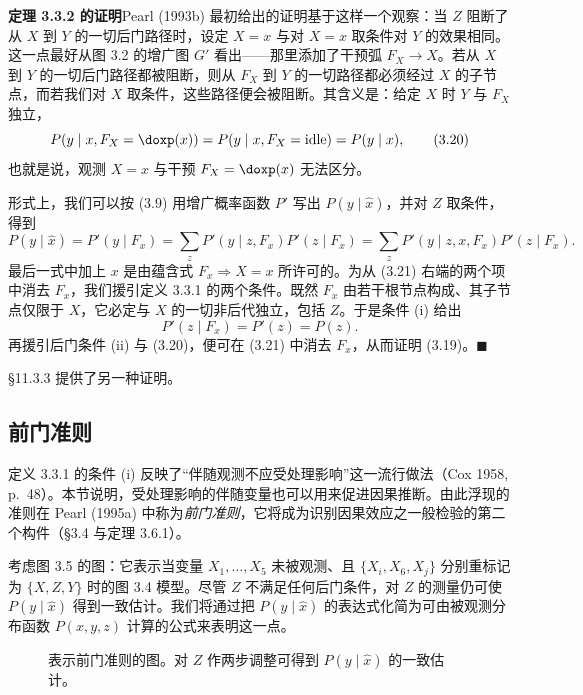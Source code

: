 \noindent\textbf{定理 3.3.2 的证明}\quad Pearl (1993b) 最初给出的证明基于这样一个观察：当 $Z$ 阻断了从 $X$ 到 $Y$ 的一切后门路径时，设定 $X=x$ 与对 $X=x$ 取条件对 $Y$ 的效果相同。这一点最好从图 3.2 的增广图 $G'$ 看出——那里添加了干预弧 $F_X\to X$。若从 $X$ 到 $Y$ 的一切后门路径都被阻断，则从 $F_X$ 到 $Y$ 的一切路径都必须经过 $X$ 的子节点，而若我们对 $X$ 取条件，这些路径便会被阻断。其含义是：给定 $X$ 时 $Y$ 与 $F_X$ 独立，
\begin{equation}
P(y\mid x, F_X=\doxp(x)) = P(y\mid x, F_X=\text{idle}) = P(y\mid x), \tag{3.20}
\end{equation}
也就是说，观测 $X=x$ 与干预 $F_X=\doxp(x)$ 无法区分。

形式上，我们可以按 \textup{(3.9)} 用增广概率函数 $P'$ 写出 $P(y\mid\hat{x})$，并对 $Z$ 取条件，得到
\begin{equation}
P(y\mid\hat{x}) = P'(y\mid F_x) = \sum_{z}P'(y\mid z,F_x)P'(z\mid F_x) = \sum_{z}P'(y\mid z,x,F_x)P'(z\mid F_x). \tag{3.21}
\end{equation}
最后一式中加上 $x$ 是由蕴含式 $F_x\Rightarrow X=x$ 所许可的。为从 \textup{(3.21)} 右端的两个项中消去 $F_x$，我们援引定义 3.3.1 的两个条件。既然 $F_x$ 由若干根节点构成、其子节点仅限于 $X$，它必定与 $X$ 的一切非后代独立，包括 $Z$。于是条件 (i) 给出
\[
P'(z\mid F_x)=P'(z)=P(z).
\]
再援引后门条件 (ii) 与 \textup{(3.20)}，便可在 \textup{(3.21)} 中消去 $F_x$，从而证明 \textup{(3.19)}。\hfill$\blacksquare$

\S 11.3.3 提供了另一种证明。

\subsection{前门准则}

定义 3.3.1 的条件 (i) 反映了“伴随观测不应受处理影响”这一流行做法（Cox 1958, p.~48）。本节说明，受处理影响的伴随变量也可以用来促进因果推断。由此浮现的准则在 Pearl (1995a) 中称为\emph{前门准则}，它将成为识别因果效应之一般检验的第二个构件（\S 3.4 与定理 3.6.1）。

考虑图 3.5 的图：它表示当变量 $X_1,\dots,X_5$ 未被观测、且 $\{X_i,X_6,X_j\}$ 分别重标记为 $\{X,Z,Y\}$ 时的图 3.4 模型。尽管 $Z$ 不满足任何后门条件，对 $Z$ 的测量仍可使 $P(y\mid\hat{x})$ 得到一致估计。我们将通过把 $P(y\mid\hat{x})$ 的表达式化简为可由被观测分布函数 $P(x,y,z)$ 计算的公式来表明这一点。

\begin{figure}[htbp]
\centering
{}
\caption{表示前门准则的图。对 $Z$ 作两步调整可得到 $P(y\mid\hat{x})$ 的一致估计。}
\label{fig:3.5}
\end{figure}

